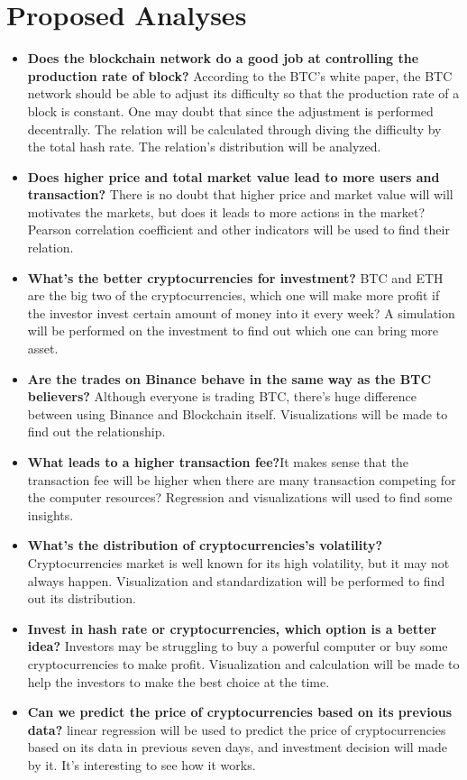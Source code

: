 \documentclass[a4paper]{article}
\begin{document}
\section{Proposed Analyses}
\begin{itemize}
    \item \textbf{Does the blockchain network do a good job at controlling the production rate of block? } According to the BTC's white paper, the BTC network should be able to adjust its difficulty so that the production rate of a block is constant. One may doubt that since the adjustment is performed decentrally. The relation will be calculated through diving the difficulty by the total hash rate. The relation's distribution will be analyzed.
    \item \textbf{Does higher price and total market value lead to more users and transaction?} There is no doubt that higher price and market value will will motivates the markets, but does it leads to more actions in the market? Pearson correlation coefficient and other indicators will be used to find their relation.
    \item \textbf{What's the better cryptocurrencies for investment?} BTC and ETH are the big two of the cryptocurrencies, which one will make more profit if the investor invest certain amount of money into it every week? A simulation will be performed on the investment to find out which one can bring more asset.
    \item \textbf{Are the trades on Binance behave in the same way as the BTC believers?} Although everyone is trading BTC, there's huge difference between using Binance and Blockchain itself. Visualizations will be made to find out the relationship.
    \item \textbf{What leads to a higher transaction fee?}It makes sense that the transaction fee will be higher when there are many transaction competing for the computer resources? Regression and visualizations will used to find some insights.
    \item \textbf{What's the distribution of cryptocurrencies's volatility?} Cryptocurrencies market is well known for its high volatility, but it may not always happen. Visualization and standardization will be performed to find out its distribution.
    \item \textbf{Invest in hash rate or cryptocurrencies, which option is a better idea?} Investors may be struggling to buy a powerful computer or buy some cryptocurrencies to make profit. Visualization and calculation will be made to help the investors to make the best choice at the time.
    \item \textbf{Can we predict the price of cryptocurrencies based on its previous data?}
    linear regression will be used to predict the price of cryptocurrencies based on its data in previous seven days, and investment decision will made by it. It's interesting to see how it works.
\end{itemize}
\end{document}
